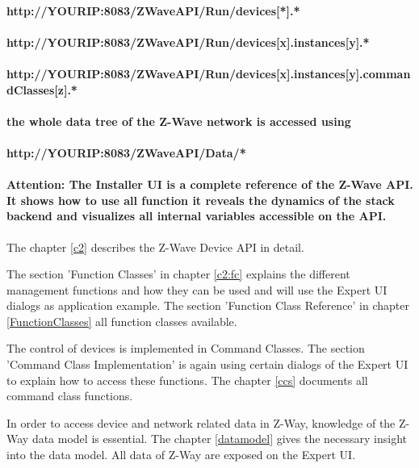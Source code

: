 \paragraph{http://YOURIP:8083/ZWaveAPI/Run/devices[*].* }
\paragraph{http://YOURIP:8083/ZWaveAPI/Run/devices[x].instances[y].*}
\paragraph{http://YOURIP:8083/ZWaveAPI/Run/devices[x].instances[y].commandClasses[z].*} 
\paragraph{the whole data tree of the Z-Wave network is accessed using}  
\paragraph{http://YOURIP:8083/ZWaveAPI/Data/*}

\paragraph{
\textbf{Attention: The Installer UI is a complete reference of the Z-Wave API. It shows how 
to use all function it reveals the dynamics of the stack backend and visualizes all 
internal variables accessible on the API. }}

The chapter \ref{c2} describes the Z-Wave Device API in detail.

The section 'Function Classes' in chapter \ref{c2:fc} explains the different management 
functions and how they  can be used and will use the Expert UI dialogs as application example. The 
section 'Function Class Reference' in chapter \ref{FunctionClasses} all function 
classes available.

The control of devices  is implemented in Command Classes. The section 'Command Class 
Implementation' is again using certain dialogs of the Expert UI to explain how to access 
these functions. The chapter \ref{ccs} documents all 
command class functions. 

In order to access device and network related data in Z-Way, knowledge of the Z-Way 
data model is essential. The chapter \ref{datamodel} gives the necessary insight 
into the data model. All data of Z-Way are exposed on the Expert UI.

